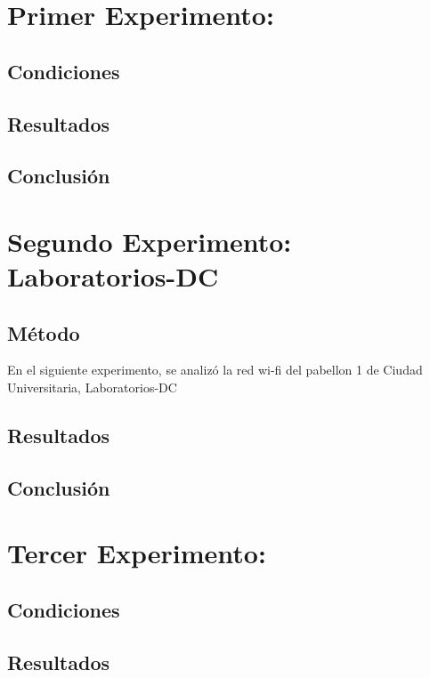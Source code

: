 \documentclass{article}
\theoremstyle{definition}
\theoremstyle{remark}
\begin{document}
\newpage

\section{Primer Experimento: }

\subsection{Condiciones}

\subsection{Resultados}

\subsection{Conclusión}

\newpage

\section{Segundo Experimento: Laboratorios-DC}

\subsection{Método}
En el siguiente experimento, se analizó la red wi-fi del pabellon 1 de Ciudad Universitaria, Laboratorios-DC 

\subsection{Resultados}

\subsection{Conclusión}

\newpage

\section{Tercer Experimento: }

\subsection{Condiciones}

\subsection{Resultados}
\end{document}
